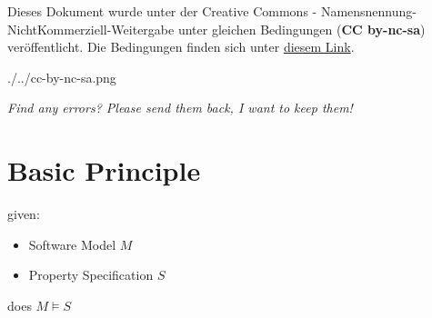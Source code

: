\documentclass[a4paper, 10pt]{article}
\begin{document}

\begin{shaded}
Dieses Dokument wurde unter der Creative Commons - Namensnennung-NichtKommerziell-Weitergabe unter gleichen Bedingungen (\textbf{CC by-nc-sa}) veröffentlicht. Die Bedingungen finden sich unter \href{http://creativecommons.org/licenses/by-nc-sa/3.0/de}{diesem Link}. \\
\centerline{./../cc-by-nc-sa.png}
\end{shaded}

\textit{\hm \; Find any errors? Please send them back, I want to keep them!}

\section*{Basic Principle}
\begin{multicols}{2}
given:
\begin{itemize}
    \item Software Model $M$
    \item Property Specification $S$
\end{itemize}
does $M\models S$
\columnbreak
\begin{center}
\scalebox{0.75}{}
\end{center}
\end{multicols}
\end{document}
